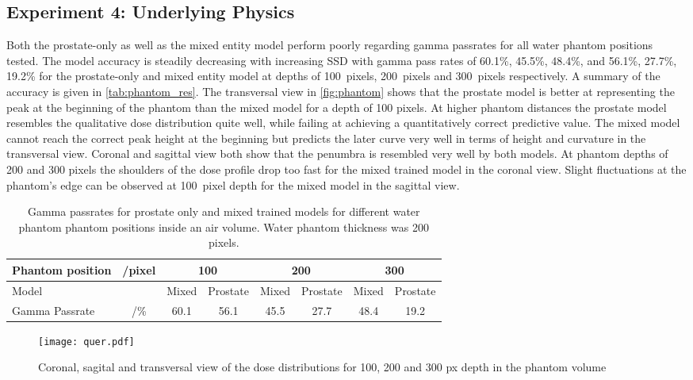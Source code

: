 \subsection{Experiment 4: Underlying Physics}

Both the prostate-only as well as the mixed entity model perform poorly regarding gamma passrates for all water phantom positions tested. 
The model accuracy is steadily decreasing with increasing \acs{SSD} with gamma pass rates of 60.1\%, 45.5\%, 48.4\%, and 56.1\%, 27.7\%, 19.2\% for the prostate-only and mixed entity model at depths of 100~pixels, 200~pixels and 300~pixels respectively. A summary of the accuracy is given in \autoref{tab:phantom_res}. 
The transversal view in \autoref{fig:phantom} shows that the prostate model is better at representing the peak at the beginning of the phantom than the mixed model for a depth of 100 pixels. 
At higher phantom distances the prostate model resembles the qualitative dose distribution quite well, while failing at achieving a quantitatively correct predictive value. 
The mixed model cannot reach the correct peak height at the beginning but predicts the later curve very well in terms of height and curvature in the transversal view. 
Coronal and sagittal view both show that the penumbra is resembled very well by both models. 
At phantom depths of 200 and 300 pixels the shoulders of the dose profile drop too fast for the mixed trained model in the coronal view.
Slight fluctuations at the phantom's edge can be observed at 100~pixel depth for the mixed model in the sagittal view.
 
\begin{table}
    \begin{tabular}{|lc|cc|cc|cc|}
    \hline
    Phantom position & /pixel & \multicolumn{2}{c|}{\textbf{100}} & \multicolumn{2}{c|}{\textbf{200}} & \multicolumn{2}{c|}{\textbf{300}} \\ \hline
    Model               &        & Mixed          & Prostate         & Mixed          & Prostate         & Mixed          & Prostate         \\
    Gamma Passrate      & /\%    & 60.1         & 56.1           & 45.5         & 27.7           & 48.4         & 19.2           \\ \hline
    \end{tabular}
    \caption{Gamma passrates for prostate only and mixed trained models for different water phantom phantom positions inside an air volume. Water phantom thickness was 200 pixels.}\label{tab:phantom_res}
\end{table}

\begin{figure}[htb]
    \centering
    \texttt{[image: quer.pdf]}
    \caption{Coronal, sagital and transversal view of the dose distributions for 100, 200 and 300 px depth in the phantom volume}\label{fig:phantom}
\end{figure}